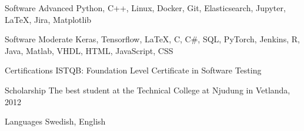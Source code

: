 

\begin{cvskills}

  \cvskill
    {Software Advanced} %
    {Python, C++, Linux, Docker, Git, Elasticsearch, Jupyter, LaTeX, Jira, Matplotlib} %

  \cvskill
    {Software Moderate} %
    {Keras, Tensorflow, LaTeX, C, C\#, SQL, PyTorch, Jenkins, R, Java, Matlab, VHDL, HTML, JavaScript, CSS} %

  \cvskill
  {Certifications} %
  {ISTQB: Foundation Level Certificate in Software Testing} %

  \cvskill
    {Scholarship} %
    {The best student at the Technical College at Njudung in Vetlanda, 2012} %

  \cvskill
    {Languages} %
    {Swedish, English} %

\end{cvskills}
